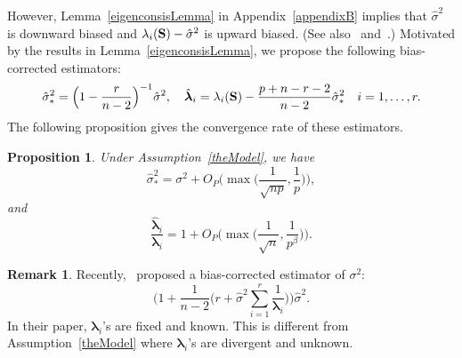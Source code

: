 \documentclass[3p]{elsarticle}
\newcommand{\bfsym}[1]{\ensuremath{\boldsymbol{#1}}}
\def\blambda {\bfsym {\lambda}}        \def\bLambda {\bfsym {\Lambda}}
\theoremstyle{plain}
\newtheorem{proposition}{\quad\quad Proposition}
\theoremstyle{definition}
\newtheorem{remark}{\quad\quad Remark}
\theoremstyle{remark}
\begin{document}
However, Lemma~\ref{eigenconsisLemma} in Appendix~\ref{appendixB} implies that $\hat{\sigma}^2$ is downward biased and $\lambda_i(\mathbf{S})-\hat{\sigma}^2$ is upward biased.
(See also~\cite{Passemier2015} and~\cite{Fan2015Asymptotics}.)
Motivated by the results in Lemma~\ref{eigenconsisLemma}, we propose the following bias-corrected estimators:
$$
\hat{\sigma}_*^2= \Big(1-\frac{r}{n-2}\Big)^{-1} \hat{\sigma}^2,
\quad
\hat{\blambda}_i=\lambda_i(\BS)-\frac{p+n-r-2}{n-2}\hat{\sigma}_*^2
\quad i=1,\ldots,r.
$$
The following proposition gives the convergence rate of these estimators.
\begin{proposition}\label{varianceEstimation}
    Under Assumption~\ref{theModel}, we have %
    \begin{equation}\label{varianceEstimationPropResult1}
    \hat{\sigma}_*^2=\sigma^2 + O_P\Big(\max \big(\frac{1}{\sqrt{np}},\frac{1}{p}\big)\Big),
    \end{equation}
    and
    \begin{equation}\label{varianceEstimationPropResult2}
        \frac{\hat{\blambda}_i}{\blambda_i}
        =
        1+
        O_P\Big(\max\big(\frac{1}{\sqrt{n}},\frac{1}{p^{\beta}}\big)\Big).
    \end{equation}
\end{proposition}
\begin{remark}
Recently,~\cite{Passemier2015} proposed a bias-corrected estimator of $\sigma^2$:
$$
\Big(1+\frac{1}{n-2}\big(r+\hat{\sigma}^2\sum_{i=1}^r \frac{1}{\blambda_i}\big)\Big)\hat{\sigma}^2.
$$
In their paper, $\blambda_i$'s are fixed and known.
    This is different from Assumption~\ref{theModel} where $\blambda_i$'s are divergent and unknown.
\end{remark}
\end{document}
